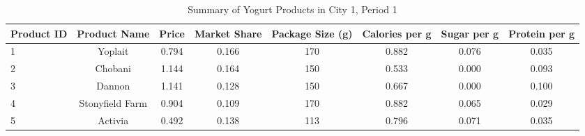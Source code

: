 \begin{table}[htbp]
\centering
\begin{tabular}{lccccccc}
\toprule
Product ID & Product Name & Price & Market Share & Package Size (g) & Calories per g & Sugar per g & Protein per g \\
\midrule
1 & Yoplait & 0.794 & 0.166 & 170 & 0.882 & 0.076 & 0.035 \\
2 & Chobani & 1.144 & 0.164 & 150 & 0.533 & 0.000 & 0.093 \\
3 & Dannon & 1.141 & 0.128 & 150 & 0.667 & 0.000 & 0.100 \\
4 & Stonyfield Farm & 0.904 & 0.109 & 170 & 0.882 & 0.065 & 0.029 \\
5 & Activia & 0.492 & 0.138 & 113 & 0.796 & 0.071 & 0.035 \\
\bottomrule
\end{tabular}

\caption{Summary of Yogurt Products in City 1, Period 1}
\label{tab:yoghurt_summary}
\end{table}
